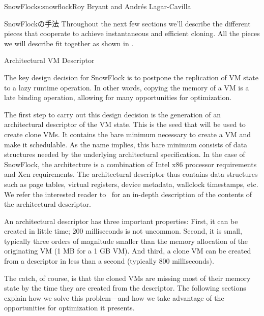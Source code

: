 \begin{aosachapter}{SnowFlock}{s:snowflock}{Roy Bryant and Andr\'e{s} Lagar-Cavilla}
\begin{aosasect1}{SnowFlockの手法}
Throughout the next few sections we'll describe the different pieces
that cooperate to achieve instantaneous and efficient cloning. All
the pieces we will describe fit together as shown in
.


\end{aosasect1}

\begin{aosasect1}{Architectural VM Descriptor}

The key design decision for SnowFlock is to postpone the replication
of VM state to a lazy runtime operation. In other words, copying the
memory of a VM is a late binding operation, allowing for many
opportunities for optimization.

The first step to carry out this design decision is the generation of
an architectural descriptor of the VM state. This is the seed that
will be used to create clone VMs. It contains the bare minimum
necessary to create a VM and make it schedulable. As the name implies,
this bare minimum consists of data structures needed by the underlying
architectural specification.  In the case of SnowFlock, the
architecture is a combination of Intel x86 processor requirements and
Xen requirements. The architectural descriptor thus contains data
structures such as page tables, virtual registers, device metadata,
wallclock timestamps, etc. We refer the interested reader to~\cite{bib:snowflocktocs}
for an in-depth description of the contents of the
architectural descriptor.

An architectural descriptor has three important properties: First, it
can be created in little time; 200 milliseconds is not
uncommon. Second, it is small, typically three orders of magnitude
smaller than the memory allocation of the originating VM (1 MB for a 1
GB VM). And third, a clone VM can be created from a descriptor in less
than a second (typically 800 milliseconds).

The catch, of course, is that the cloned VMs are missing most of their
memory state by the time they are created from the descriptor. The
following sections explain how we solve this problem---and how we take
advantage of the opportunities for optimization it presents.


\end{aosasect1}
\end{aosachapter}
